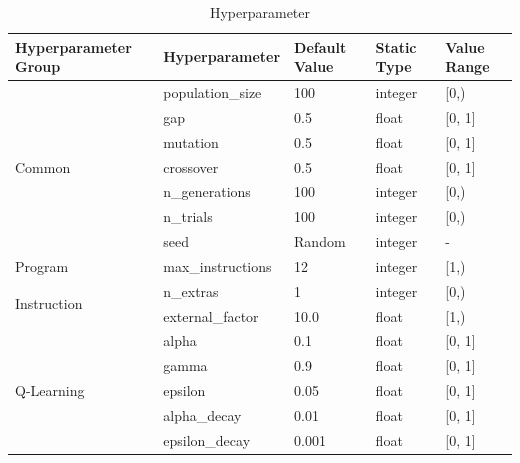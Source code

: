 \documentclass[12pt, final]{dalcsthesis}
\begin{document}
\begin{table}[hb]
	\centering
	\begin{tabular}{|p{3.5cm}|p{3cm}|p{2.5cm}|p{1.5cm}|p{1.5cm}|}
		\hline
		\textbf{Hyperparameter Group} & \textbf{Hyperparameter} & \textbf{Default Value} & \textbf{Static Type} & \textbf{Value Range} \\ \hline
		\multirow{7}{*}{Common}       & population\_size        & 100                    & integer              & [0,)                    \\ \cline{2-5}
		                              & gap                     & 0.5                    & float                & [0, 1]               \\ \cline{2-5}
		                              & mutation                & 0.5                    & float                & [0, 1]               \\ \cline{2-5}
		                              & crossover               & 0.5                    & float                & [0, 1]               \\ \cline{2-5}
																	& n\_generations          & 100                    & integer              & [0,)                    \\ \cline{2-5}
																	& n\_trials               & 100                    & integer              & [0,)                    \\ \cline{2-5}
		                              & seed                    & Random & integer              & -                    \\ \hline
		Program                       & max\_instructions       & 12                     & integer              & [1,)                    \\ \hline
		\multirow{2}{*}{Instruction}  & n\_extras               & 1                      & integer              & [0,)                    \\ \cline{2-5}
		                              & external\_factor        & 10.0                   & float                & [1,)                    \\ \hline
		\multirow{5}{*}{Q-Learning}   & alpha                   & 0.1                    & float                & [0, 1]               \\ \cline{2-5}
		                              & gamma                   & 0.9                    & float                & [0, 1]               \\ \cline{2-5}
		                              & epsilon                 & 0.05                   & float                & [0, 1]               \\ \cline{2-5}
		                              & alpha\_decay            & 0.01                   & float                & [0, 1]               \\ \cline{2-5}
		                              & epsilon\_decay          & 0.001                  & float                & [0, 1]               \\ \hline
	\end{tabular}
	\caption{Hyperparameter}
	\label{table:hyperparameters}
\end{table}
\end{document}
